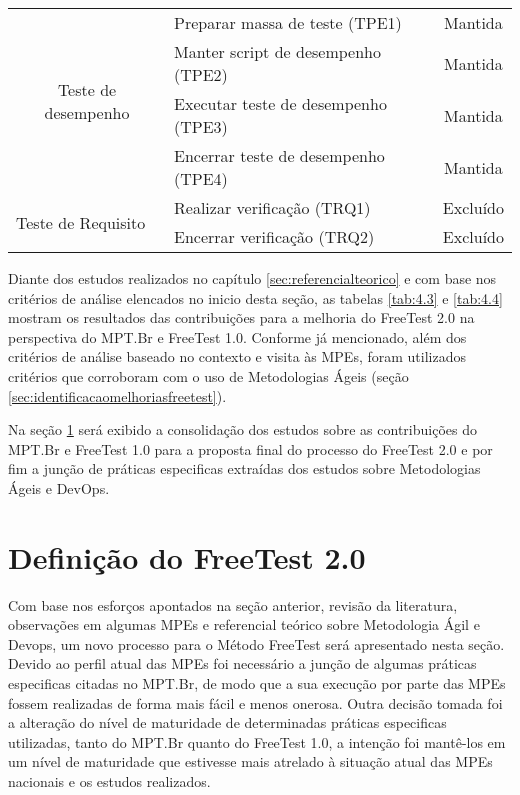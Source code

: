 \begin{table}[H]
\begin{tabular}{|c|l|c|}
\multirow{4}{*}{Teste de desempenho}                      & Preparar massa de teste (TPE1)                   & Mantida                       \\ \cline{2-3} 
                                                          & Manter script de desempenho (TPE2)               & Mantida                       \\ \cline{2-3} 
                                                          & Executar teste de desempenho (TPE3)              & Mantida                       \\ \cline{2-3} 
                                                          & Encerrar teste de desempenho (TPE4)              & Mantida                       \\ \hline
\multicolumn{1}{|l|}{\multirow{2}{*}{Teste de Requisito}} & Realizar verificação (TRQ1)                      & \multicolumn{1}{l|}{Excluído} \\ \cline{2-3} 
\multicolumn{1}{|l|}{}                                    & Encerrar verificação (TRQ2)                      & \multicolumn{1}{l|}{Excluído} \\ \hline
\end{tabular}
\end{table}

Diante dos estudos realizados no capítulo \ref{sec:referencialteorico} e com base nos critérios de análise elencados no inicio desta seção, as tabelas \ref{tab:4.3} e \ref{tab:4.4} mostram os resultados das contribuições para a melhoria do FreeTest 2.0 na perspectiva do MPT.Br e FreeTest 1.0. Conforme já mencionado, além dos critérios de análise baseado no contexto e visita às MPEs, foram utilizados critérios que corroboram com o uso de Metodologias Ágeis (seção \ref{sec:identificacaomelhoriasfreetest}). 

Na seção \ref{sec:novoprocesso} será exibido a consolidação dos estudos sobre as contribuições do MPT.Br e FreeTest 1.0 para a proposta final do processo do FreeTest 2.0 e por fim a junção de práticas especificas extraídas dos estudos sobre Metodologias Ágeis e DevOps.


\section{Definição do FreeTest 2.0}
\label{sec:novoprocesso}

Com base nos esforços apontados na seção anterior, revisão da literatura, observações em algumas MPEs e referencial teórico sobre Metodologia Ágil e Devops, um novo processo para o Método FreeTest será apresentado nesta seção. Devido ao perfil atual das MPEs foi necessário a junção de algumas práticas especificas citadas no MPT.Br, de modo que a sua execução por parte das MPEs fossem realizadas de forma mais fácil e menos onerosa. Outra decisão tomada foi a alteração do nível de maturidade de determinadas práticas especificas utilizadas, tanto do MPT.Br quanto do FreeTest 1.0, a intenção foi mantê-los em um nível de maturidade que estivesse mais atrelado à situação atual das MPEs nacionais \cite{Especialistas2015, SilvaDias2015} e os estudos realizados.

